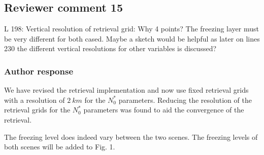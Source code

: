 \documentclass[11pt]{scrartcl}
\begin{document}
%
%
%


\subsection*{Reviewer comment 15}

L 198: Vertical resolution of retrieval grid: Why 4 points? The freezing layer
must be very different for both cased. Maybe a sketch would be helpful as later
on lines 230 the different vertical resolutions for other variables is discussed?

\subsubsection*{Author response}

We have revised the retrieval implementation and now use fixed retrieval grids
with a resolution of  $2\ \unit{km}$ for the $N_0^*$ parameters. Reducing the
resolution of the retrieval grids for the $N_0^*$ parameters was found to aid
the convergence of the retrieval.

The freezing level does indeed vary between the two scenes. The freezing levels
of both scenes will be added to Fig. 1.
\end{document}
